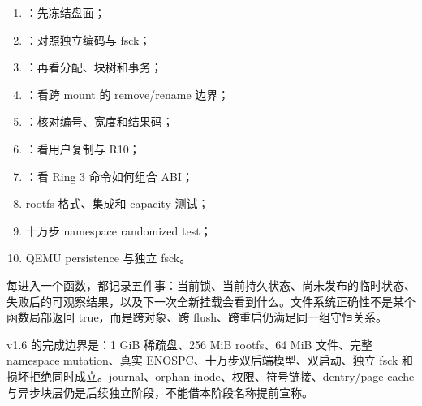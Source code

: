 \begin{enumerate}
  \item {}：先冻结盘面；
  \item {}：对照独立编码与 fsck；
  \item {}：再看分配、块树和事务；
  \item {}：看跨 mount 的 remove/rename 边界；
  \item {}：核对编号、宽度和结果码；
  \item {}：看用户复制与 R10；
  \item {}：看 Ring 3 命令如何组合 ABI；
  \item rootfs 格式、集成和 capacity 测试；
  \item 十万步 namespace randomized test；
  \item QEMU persistence 与独立 fsck。
\end{enumerate}

每进入一个函数，都记录五件事：当前锁、当前持久状态、尚未发布的临时状态、
失败后的可观察结果，以及下一次全新挂载会看到什么。文件系统正确性不是某个
函数局部返回 true，而是跨对象、跨 flush、跨重启仍满足同一组守恒关系。

\begin{contractbox}
v1.6 的完成边界是：1 GiB 稀疏盘、256 MiB rootfs、64 MiB 文件、完整
namespace mutation、真实 ENOSPC、十万步双后端模型、双启动、独立 fsck 和
损坏拒绝同时成立。journal、orphan inode、权限、符号链接、dentry/page
cache 与异步块层仍是后续独立阶段，不能借本阶段名称提前宣称。
\end{contractbox}
